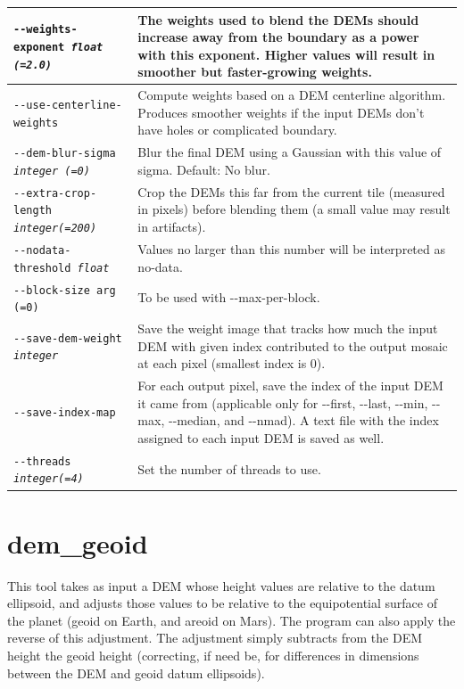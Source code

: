 \begin{longtable}{|l|p{10cm}|}
\texttt{-\/-weights-exponent \textit{float (=2.0)} } &
The weights used to blend the DEMs should increase away from the boundary as a power with this exponent. Higher values will result in smoother but faster-growing weights.
\\ \hline

\texttt{-\/-use-centerline-weights} &
Compute weights based on a DEM centerline algorithm. Produces smoother weights if the input DEMs don't have holes or complicated boundary.
\\ \hline

\texttt{-\/-dem-blur-sigma \textit{integer (=0)} } & Blur the final DEM using a Gaussian with this value of sigma. Default: No blur. \\ \hline

\texttt{-\/-extra-crop-length \textit{integer(=200)}} &
Crop the DEMs this far from the current tile (measured in pixels) before blending them (a small value may result in artifacts).
\\ \hline

\texttt{-\/-nodata-threshold \textit{float}} & Values no larger than this number will be interpreted as no-data.\\ \hline

\texttt{-\/-block-size arg (=0)} & To be used with -\/-max-per-block.\\ \hline

\texttt{-\/-save-dem-weight \textit{integer}} &
Save the weight image that tracks how much the input DEM with given index contributed to the output mosaic at each pixel (smallest index is 0).\\ \hline

\texttt{-\/-save-index-map} &
For each output pixel, save the index of the input DEM it came from
(applicable only for -\/-first, -\/-last, -\/-min, -\/-max, -\/-median, and -\/-nmad). A text
file with the index assigned to each input DEM is saved as well.\\ \hline

\texttt{-\/-threads \textit{integer(=4)}}
& Set the number of threads to use. \\ \hline
\end{longtable}

\clearpage

\section{dem\_geoid}
\label{demgeoid}

This tool takes as input a \ac{DEM} whose height values are relative to the
datum ellipsoid, and adjusts those values to be relative to the
equipotential surface of the planet (geoid on Earth, and areoid on
Mars). The program can also apply the reverse of this adjustment. The
adjustment simply subtracts from the DEM height the geoid height
(correcting, if need be, for differences in dimensions between the DEM
and geoid datum ellipsoids).

